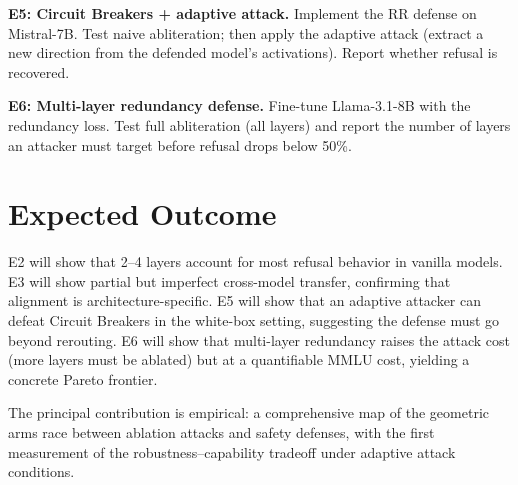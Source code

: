 \documentclass[11pt]{article}
\begin{document}
\textbf{E5: Circuit Breakers + adaptive attack.} Implement the RR defense on
Mistral-7B. Test naive abliteration; then apply the adaptive attack
(extract a new direction from the defended model's activations). Report
whether refusal is recovered.

\textbf{E6: Multi-layer redundancy defense.} Fine-tune Llama-3.1-8B with the
redundancy loss. Test full abliteration (all layers) and report the
number of layers an attacker must target before refusal drops below 50\%.

\section{Expected Outcome}\label{expected-outcome}

E2 will show that 2--4 layers account for most refusal behavior in
vanilla models. E3 will show partial but imperfect cross-model transfer,
confirming that alignment is architecture-specific. E5 will show that an
adaptive attacker can defeat Circuit Breakers in the white-box setting,
suggesting the defense must go beyond rerouting. E6 will show that
multi-layer redundancy raises the attack cost (more layers must be
ablated) but at a quantifiable MMLU cost, yielding a concrete Pareto
frontier.

The principal contribution is empirical: a comprehensive map of the
geometric arms race between ablation attacks and safety defenses, with
the first measurement of the robustness--capability tradeoff under
adaptive attack conditions.

% 
% 
\end{document}

